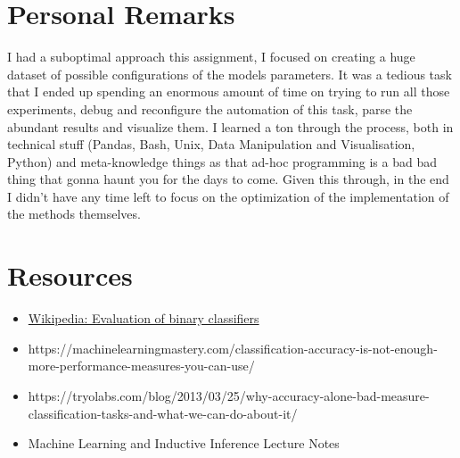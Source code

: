 \documentclass[12pt]{article}
\begin{document}
%




\section{Personal Remarks}

I had a suboptimal approach this assignment, I focused on creating a huge dataset of possible configurations of the models parameters. It was a tedious task that I ended up spending an enormous amount of time on trying to run all those experiments, debug and reconfigure the automation of this task, parse the abundant results and visualize them. I learned a ton through the process, both in technical stuff (Pandas, Bash, Unix, Data Manipulation and Visualisation, Python) and meta-knowledge things as that ad-hoc programming is a bad bad thing that gonna haunt you for the days to come. Given this through, in the end I didn't have any time left to focus on the optimization of the implementation of the methods themselves. 

\section{Resources}

\begin{itemize}

  \item \hyperlink{https://en.wikipedia.org/wiki/Evaluation_of_binary_classifiersx}{Wikipedia: Evaluation of binary classifiers}
  \item https://machinelearningmastery.com/classification-accuracy-is-not-enough-more-performance-measures-you-can-use/
  \item https://tryolabs.com/blog/2013/03/25/why-accuracy-alone-bad-measure-classification-tasks-and-what-we-can-do-about-it/
  \item Machine Learning and Inductive Inference Lecture Notes

\end{itemize}
\end{document}
